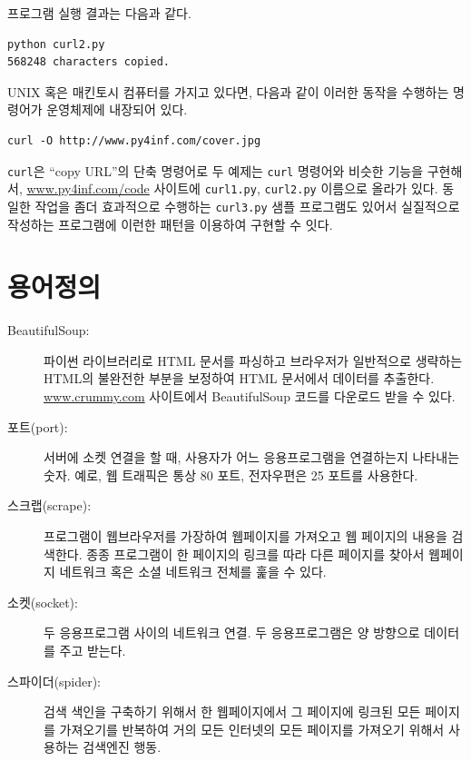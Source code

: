 프로그램 실행 결과는 다음과 같다.

\beforeverb
\begin{verbatim}
python curl2.py 
568248 characters copied.
\end{verbatim}
\afterverb
%

UNIX 혹은 매킨토시 컴퓨터를 가지고 있다면, 다음과 같이 이러한 동작을 수행하는 명령어가 운영체제에 내장되어 있다.


\beforeverb
\begin{verbatim}
curl -O http://www.py4inf.com/cover.jpg
\end{verbatim}
\afterverb
%

{\tt curl}은 ``copy URL''의 단축 명령어로 두 예제는 {\tt curl} 명령어와 비슷한 기능을 구현해서, 
\url{www.py4inf.com/code} 사이트에 {\tt curl1.py}, {\tt curl2.py} 이름으로 올라가 있다.
동일한 작업을 좀더 효과적으로 수행하는 {\tt curl3.py} 샘플 프로그램도 있어서 실질적으로 작성하는 프로그램에 이런한 패턴을 이용하여 구현할 수 잇다.

\section{용어정의}

\begin{description}

\item[BeautifulSoup:] 파이썬 라이브러리로 HTML 문서를 파싱하고 
브라우저가 일반적으로 생략하는 HTML의 불완전한 부분을 보정하여 HTML 문서에서 데이터를 추출한다.
\url{www.crummy.com} 사이트에서 BeautifulSoup 코드를 다운로드 받을 수 있다.


\item[포트(port):] 서버에 소켓 연결을 할 때, 사용자가 어느 응용프로그램을 연결하는지 나타내는 숫자.
예로, 웹 트래픽은 통상 80 포트, 전자우편은 25 포트를 사용한다.


\item[스크랩(scrape):] 프로그램이 웹브라우저를 가장하여 웹페이지를 가져오고 웹 페이지의 내용을 검색한다.
종종 프로그램이 한 페이지의 링크를 따라 다른 페이지를 찾아서 웹페이지 네트워크 혹은 소셜 네트워크 전체를 훑을 수 있다.


\item[소켓(socket):] 두 응용프로그램 사이의 네트워크 연결. 두 응용프로그램은 양 방향으로 데이터를 주고 받는다.

\item[스파이더(spider):] 검색 색인을 구축하기 위해서 한 웹페이지에서 그 페이지에 링크된 모든 페이지를 가져오기를 반복하여
거의 모든 인터넷의 모든 페이지를 가져오기 위해서 사용하는 검색엔진 행동.

\end{description}

